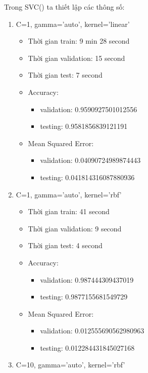 \documentclass{article}
\begin{document}
Trong SVC() ta thiết lập các thông số:
\begin{enumerate}
	\item C=1, gamma='auto', kernel='linear'
	      \begin{itemize}
		      \item Thời gian train: 9 min 28 second
		      \item Thời gian validation: 15 second
		      \item Thời gian test: 7 second
		      \item Accuracy:
		            \begin{itemize}
			            \item validation: 0.9590927501012556
			            \item testing: 0.9581856839121191
		            \end{itemize}
		      \item Mean Squared Error:
		            \begin{itemize}
			            \item validation: 0.04090724989874443
			            \item testing: 0.041814316087880936
		            \end{itemize}
	      \end{itemize}
	\item C=1, gamma='auto', kernel='rbf'
	      \begin{itemize}
		      \item Thời gian train: 41 second
		      \item Thời gian validation: 9 second
		      \item Thời gian test: 4 second
		      \item Accuracy:
		            \begin{itemize}
			            \item validation: 0.987444309437019
			            \item testing: 0.9877155681549729
		            \end{itemize}
		      \item Mean Squared Error:
		            \begin{itemize}
			            \item validation: 0.012555690562980963
			            \item testing: 0.012284431845027168
		            \end{itemize}
	      \end{itemize}
	\item C=10, gamma='auto', kernel='rbf'

\end{enumerate}
\end{document}
